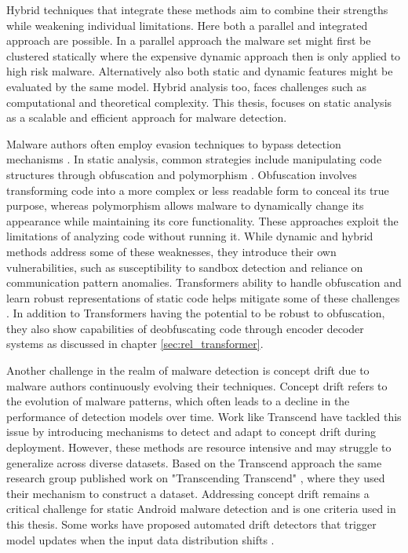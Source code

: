 Hybrid techniques that integrate these methods aim to combine their strengths while weakening individual limitations.
Here both a parallel and integrated approach are possible.
In a parallel approach the malware set might first be clustered statically where the expensive dynamic approach then is only
applied to high risk malware. 
Alternatively also both static and dynamic features might be evaluated by the same model.
Hybrid analysis too, faces challenges such as computational and theoretical complexity.
This thesis, focuses on static analysis as a scalable and efficient approach for malware detection.

Malware authors often employ evasion techniques to bypass detection mechanisms \cite{vorlesung}.
In static analysis, common strategies include manipulating code structures through 
obfuscation \cite{obfuscation} and polymorphism \cite{polymorhism}.
Obfuscation involves transforming code into a more complex or less readable form to conceal its true purpose, 
whereas polymorphism allows malware to dynamically change its appearance while maintaining its core functionality.
These approaches exploit the limitations of analyzing code without running it.
While dynamic and hybrid methods address some of these weaknesses, 
they introduce their own vulnerabilities, such as susceptibility to sandbox detection and reliance on communication pattern anomalies.
Transformers ability to handle obfuscation and learn robust representations 
of static code helps mitigate some of these challenges \cite{deobfuscation}.
In addition to Transformers having the potential to be robust to obfuscation, they also show capabilities of deobfuscating code through 
encoder decoder systems as discussed in chapter \ref{sec:rel_transformer}.

Another challenge in the realm of malware detection is concept drift due to malware authors continuously evolving their techniques.
Concept drift refers to the evolution of malware patterns, which often leads to a decline in the performance of detection models over time.
Work like Transcend \cite{transcend} have tackled this issue by introducing mechanisms to detect and adapt to concept drift during deployment.
However, these methods are resource intensive and may struggle to generalize across diverse datasets.
Based on the Transcend approach the same research group published work on "Transcending Transcend" \cite{transcending}, where they used their 
mechanism to construct a dataset.
Addressing concept drift remains a critical challenge for static Android malware detection and is one criteria used in this thesis.
Some works have proposed automated drift detectors that trigger model updates when the 
input data distribution shifts \cite{morph}.

